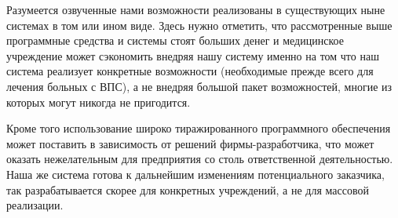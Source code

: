 Разумеется озвученные нами возможности реализованы в существующих ныне системах
в том или ином виде. Здесь нужно отметить, что рассмотренные выше программные
средства и системы стоят больших денег и медицинское учреждение может сэкономить
внедряя нашу систему именно на том что наш система реализует конкретные
возможности (необходимые прежде всего для лечения больных с ВПС), а не внедряя
большой пакет возможностей, многие из которых могут никогда не пригодится.

Кроме того использование широко тиражированного программного обеспечения может
поставить в зависимость от решений фирмы-разработчика, что может оказать
нежелательным для предприятия со столь ответственной деятельностью. Наша же
система готова к дальнейшим изменениям потенциального заказчика, так
разрабатывается скорее для конкретных учреждений, а не для массовой реализации.